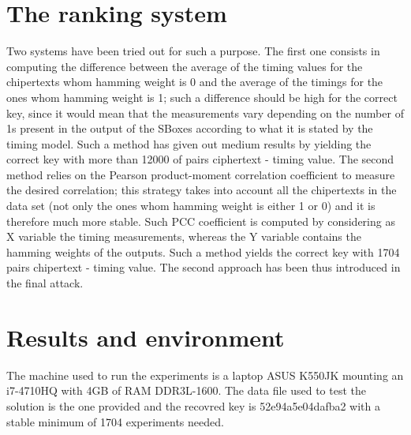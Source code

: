 \documentclass[11pt]{article} %
\begin{document}
\section{The ranking system}
Two systems have been tried out for such a purpose. The first one consists in computing the difference between the average of the timing values for the chipertexts whom hamming weight is 0 and the average of the timings for the ones whom hamming weight is 1; such a difference should be high for the correct key, since it would mean that the measurements vary depending on the number of 1s present in the output of the SBoxes according to what it is stated by the timing model. Such a method has given out medium results by yielding the correct key with more than 12000 of pairs ciphertext - timing value.
The second method relies on the Pearson product-moment correlation coefficient to measure the desired correlation; this strategy takes into account all the chipertexts in the data set (not only the ones whom hamming weight is either 1 or 0) and it is therefore much more stable. Such PCC coefficient is computed by considering as X variable the timing measurements, whereas the Y variable contains the hamming weights of the outputs. Such a method yields the correct key with 1704 pairs chipertext - timing value. The second approach has been thus introduced in the final attack. 

\section{Results and environment}
The machine used to run the experiments is a laptop ASUS K550JK mounting an i7-4710HQ with 4GB of RAM DDR3L-1600. The data file used to test the solution is the one provided and the recovred key is 52e94a5e04dafba2 with a stable minimum of 1704 experiments needed.
\end{document}
